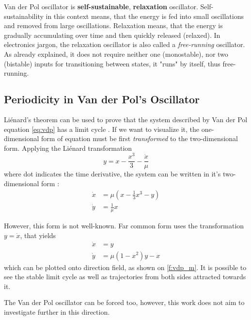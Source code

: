 \documentclass[journal]{IEEEtran}
\begin{document}
Van der Pol oscillator is \textbf{self-sustainable}, \textbf{relaxation} oscillator. Self-sustainability in this context means, that the energy is fed into small oscillations and removed from large oscillations. Relaxation means, that the energy is gradually accumulating over time and then quickly released (relaxed). In electronics jargon, the relaxation oscillator is also called a \textit{free-running} oscillator. As already explained, it does not require neither one (monostable), nor two (bistable) inputs for transitioning between states, it "runs" by itself, thus free-running.

\subsection{Periodicity in Van der Pol's Oscillator}
Li\'{e}nard's theorem can be used to prove that the system described by  Van der Pol equation \eqref{eq:vdp} has a limit cycle \cite{sternberg2014dynamical}. If we want to visualize it, the one-dimensional form of equation must be first \textit{transformed} to the two-dimensional form. Applying the Li\'{e}nard transformation $$y=x-\frac{x^3}{3}-\frac{\dot x}{\mu}$$ where dot indicates the time derivative, the system can be written in it's two-dimensional form \cite{kaplan2012understanding}:
\begin{align*}
\dot x &= \mu \left(x-\frac13 x^3 -y\right) \\
\dot y &= \frac{1}{\mu} x
\end{align*}

However, this form is not well-known. Far common form uses the transformation $y=\dot x$, that yields
\begin{align*}
\dot x &= y \\
\dot y &= \mu\left(1-x^2\right)y-x
\end{align*}
which can be plotted onto direction field, as shown on \cref{f:vdp_m}. It is possible to see the stable limit cycle as well as trajectories from both sides attracted towards it.

The Van der Pol oscillator can be forced too, however, this work does not aim to investigate further in this direction.
\end{document}
